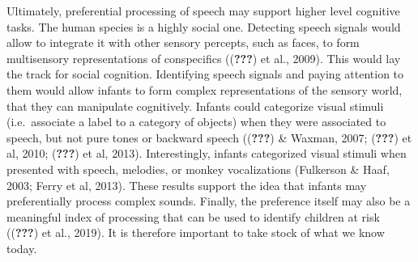 \documentclass[man]{apa6}
\begin{document}
Ultimately, preferential processing of speech may support higher level
cognitive tasks. The human species is a highly social one. Detecting
speech signals would allow to integrate it with other sensory percepts,
such as faces, to form multisensory representations of conspecifics
(({\textbf{???}}) et al., 2009). This would lay the track for social
cognition. Identifying speech signals and paying attention to them would
allow infants to form complex representations of the sensory world, that
they can manipulate cognitively. Infants could categorize visual stimuli
(i.e.~associate a label to a category of objects) when they were
associated to speech, but not pure tones or backward speech
(({\textbf{???}}) \& Waxman, 2007; ({\textbf{???}}) et al, 2010;
({\textbf{???}}) et al, 2013). Interestingly, infants categorized visual
stimuli when presented with speech, melodies, or monkey vocalizations
(Fulkerson \& Haaf, 2003; Ferry et al, 2013). These results support the
idea that infants may preferentially process complex sounds. Finally,
the preference itself may also be a meaningful index of processing that
can be used to identify children at risk (({\textbf{???}}) et al.,
2019). It is therefore important to take stock of what we know today.
\end{document}
